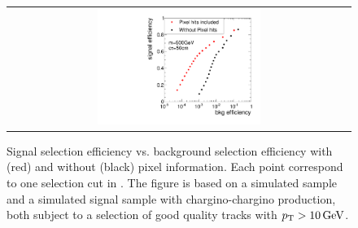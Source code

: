 \begin{figure}[!bt]
\begin{tabular}{c}
    \includegraphics[width=0.49\textwidth]{figures/analysis/rocplot_wjets_mass_500GeV_ctau_50cm.pdf}
  \end{tabular}
  \caption{Signal selection efficiency vs. background selection efficiency with (red) and without (black) pixel information.
           Each point correspond to one selection cut in \ias.
           The figure is based on a simulated \WJets sample and a simulated signal sample with chargino-chargino production, both subject to a selection of good quality tracks with $p_{\text{T}}>10\,\text{Ge}\kern-0.06667em\text{V}$.
       }
  \label{fig:ROCplots}
\end{figure} 
